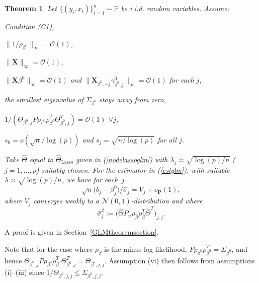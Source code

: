 \documentclass[aos,MSNbibl,dvips]{arximspdf}
\def\cal{\mathcal}
\newtheorem{theo}{Theorem}[section]
\newcommand{\PP}{\mathbb{P}}
\newcommand{\bx}{\mathbf{X}}
\begin{document}
\begin{theo} \label{GLMtheorem} Let $\{ (y_i, x_i ) \}_{i=1}^n \sim
\PP$ be i.i.d. random variables.
Assume:

\begin{longlist}[(vii)]
%
\item[(i)] Condition \textup{(C1)},
%
\item[(ii)] $\| 1 / \ddot\rho_{\beta^0} \|_{\infty} = {\mathcal
O } (1) $,
%
\item[(iii)] $\| \bx\|_{\infty} ={\mathcal O}(1)$,
%
\item[(iv)] $\|\bx\beta^0 \|_{\infty} = {\mathcal O} (1) $ and $\|
\bx
_{\beta^0, -j} \gamma_{\beta^0, j }^0 \|_{\infty} = {\mathcal O}
(1) $
for each $j$,
%
\item[(v)] the smallest eigenvalue of $\Sigma_{\beta^0} $ stays away
from zero,
%
\item[(vi)] $1/ (\Theta_{\beta^0,j} P \dot\rho_{\beta^0} \dot
\rho
_{\beta^0}^T\Theta_{\beta^0, j}^T) ={\mathcal O} (1)$ $\forall j$,
%
\item[(vii)] $s_0 = o( \sqrt n / \log(p)) $ and $s_j = \sqrt{ n /
\log(p)}$ for all $j$.
\end{longlist}
%
Take $\hat\Theta$ equal to $\hat\Theta_{\mathrm{Lasso}} $ given in
(\ref{nodelassoglm})
with $\lambda_j \asymp\sqrt{\log(p)/n}$ ($j=1, \ldots, p$)
suitably chosen.
For the estimator in (\ref{estglm}), with suitable $\lambda\asymp
\sqrt{\log(p) / n } $,
we have for each~$j$
%
\[
\sqrt{n}\bigl(\hat{b}_j - \beta_{j}^0\bigr)/
\hat{\sigma}_j = V_j + o_\mathbf {P} (1),
\]
%
where $V_j $ converges weakly to a ${\cal N}(0,1)$-distribution and
where
%
\[
\hat\sigma_j^2:= \bigl( \hat\Theta P_n
\dot\rho_{\hat\beta} \dot \rho_{\hat\beta}^T \hat{
\Theta}^T \bigr)_{j,j}. %
\]
%
\end{theo}

A proof is given in Section~\ref{GLMtheoremsection}.

Note that for the case where $\rho_{\beta}$ is the minus
log-likelihood, $P \dot\rho_{\beta^0} \dot\rho_{\beta^0}^T=
\Sigma
_{\beta^0}$,
and hence $ \Theta_{\beta^0,j} P \dot\rho_{\beta^0} \dot\rho
_{\beta
^0}^T\Theta_{\beta^0, j}^T =
\Theta_{\beta^0, j, j }$. Assumption {(vi)} then follows from
assumptions (i)--(iii) since
$1/ \Theta_{\beta^0, j, j } \le\Sigma_{\beta^0, j,j } $.

%
%
\end{document}
